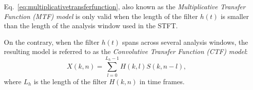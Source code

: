 Eq.~\ref{eq:multiplicativetransferfunction}, also known as the \textit{Multiplicative Transfer Function (MTF) model} is only valid when the length of the filter $h(t)$ is smaller than the length of the analysis window used in the STFT. 


On the contrary, when the filter $h(t)$ spans across several analysis windows, the resulting model is referred to as the \textit{Convolutive Transfer Function (CTF) model}:
\begin{equation}
	X(k, n) = \sum_{l=0}^{L_h-1} H(k, l) S(k, n-l), 
\label{eq:convolutivetransferfunction}
\end{equation} 
where $L_h$ is the length of the filter $H(k, n)$ in time frames. 







